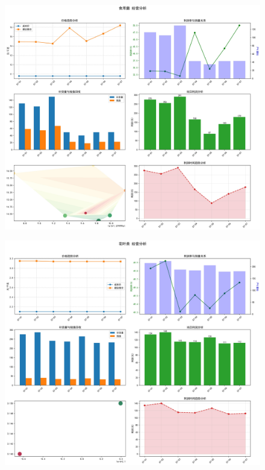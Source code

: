 \documentclass{cumcmthesis} %
\begin{document}
\begin{figure}[H]
    \centering
    \begin{minipage}[c]{0.49\textwidth}
        \centering
        \includegraphics[width=\textwidth]{fig/食用菌_可视化.jpg}
        \label{fig:sample-figure-c}
    \end{minipage}
    \hfill
    \begin{minipage}[c]{0.49\textwidth}
        \centering
        \includegraphics[width=\textwidth]{fig/花叶类_可视化.jpg}
        \label{fig:sample-figure-d}
    \end{minipage}
\end{figure}
\end{document}

